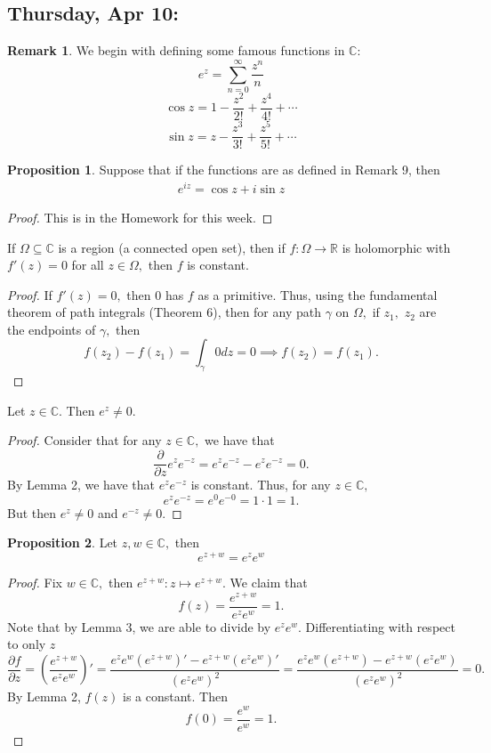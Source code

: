\documentclass[10pt, oneside]{article}
\newcommand{\bbR}{\mathbb{R}}
\newcommand{\bbC}{\mathbb{C}}
\theoremstyle{definition}
\newtheorem{prop}{Proposition}
\newtheorem{rem}{Remark}
\begin{document}
\subsection{Thursday, Apr 10: }
\begin{rem}
    We begin with defining some famous functions in $\bbC$:
    \[e^z = \sum_{n=0}^\infty \frac{z^n}{n}\]
    \[\cos z = 1 - \frac{z^2}{2!} + \frac{z^4}{4!} + \cdots\]
    \[\sin z = z - \frac{z^3}{3!} + \frac{z^5}{5!} + \cdots\]
\end{rem}
\begin{prop}
    Suppose that if the functions are as defined in Remark 9, then 
    \begin{align}
        e^{iz} = \cos z + i\sin z
    \end{align}
\end{prop}
\begin{proof}
    This is in the Homework for this week.
\end{proof}
\begin{lemma}
    If $\Omega\subseteq \bbC$ is a region (a connected open set), then if $f: \Omega \to \bbR$ is holomorphic with $f'(z) = 0$ for all $z\in \Omega,$ then $f$ is constant.
\end{lemma}
\begin{proof}
    If $f'(z) = 0,$ then $0$ has $f$ as a primitive. Thus, using the fundamental theorem of path integrals (Theorem 6), then for any path $\gamma$ on $\Omega,$ if $z_1,$ $z_2$ are the endpoints of $\gamma,$ then
    \[f(z_2) - f(z_1) = \int_\gamma 0 dz = 0 \implies f(z_2) = f(z_1).\]
\end{proof}
\begin{lemma}
    Let $z \in \bbC.$ Then $e^z \neq 0.$
\end{lemma}
\begin{proof}
Consider that for any $z\in \bbC,$ we have that
    \[\frac{\partial}{\partial z}e^ze^{-z} = e^ze^{-z} - e^ze^{-z} = 0.\] By Lemma 2, we have that $e^ze^{-z}$ is constant. Thus, for any $z\in \bbC,$
    \[e^ze^{-z} = e^0 e^{-0} = 1 \cdot 1 = 1.\] But then $e^z \neq 0$ and $e^{-z}\neq 0.$ 
\end{proof}
\begin{prop}
Let $z,w \in \bbC,$ then
    \[e^{z + w} = e^z e^w\]
\end{prop}
\begin{proof}
    Fix $w\in \bbC,$ then $e^{z + w}: z\mapsto e^{z + w}.$ We claim that 
    \[f(z)= \frac{e^{z + w}}{e^ze^w}= 1.\] Note that by Lemma 3, we are able to divide by $e^ze^w.$ Differentiating with respect to only $z$ 
    \[\frac{\partial f}{\partial z} = (\frac{e^{z + w}}{e^ze^w})' = \frac{e^ze^w(e^{z + w})' - e^{z + w}(e^{z}e^w)'}{(e^z e^w)^2} = \frac{e^ze^w(e^{z + w}) - e^{z + w}(e^{z}e^w)}{(e^z e^w)^2} = 0.\] By Lemma 2, $f(z)$ is a constant. Then 
    \[f(0) = \frac{e^w}{e^w} = 1.\] 
\end{proof}
\end{document}
